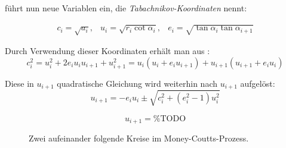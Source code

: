 \citet{Taba2000} führt nun neue Variablen ein, die \citet{Troub2000} \emph{Tabachnikov-Koordinaten} nennt:

\begin{equation}
    \begin{array}{ccc}
        c_i = \sqrt{a_i}, & u_i = \sqrt{r_i \cot\alpha_i}, & e_i = \sqrt{\tan\alpha_i \tan\alpha_{i+1}}
    \end{array}
    \label{mcp:taba-coordinates}
\end{equation}

Durch Verwendung dieser Koordinaten erhält man aus :
\begin{equation}
    c_i^2 = u_i^2 + 2 e_i u_i u_{i+1} + u_{i+1}^2
    = u_i (u_i + e_i u_{i+1}) +u_{i+1} (u_{i+1} + e_i u_i)
\end{equation}

Diese in $u_{i+1}$ quadratische Gleichung wird weiterhin nach $u_{i+1}$ aufgelöst:
\begin{equation*}
    u_{i+1} = - e_i u_i \pm \sqrt{c_i^2 + (e_i^2 - 1) u_i^2}
\end{equation*}

\begin{equation}
    u_{i+1} = \text{\% TODO}
    \label{mcp:iteration-equation}
\end{equation}

\begin{figure}[htbp]
    
    \caption{Zwei aufeinander folgende Kreise im Money-Coutts-Prozess.}
    \label{fig:mcp:two-circles}
\end{figure}



